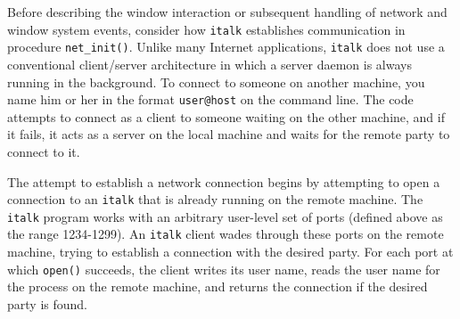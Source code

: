 
Before describing the window interaction or subsequent handling of
network and window system events, consider how \texttt{italk}
establishes communication in procedure \texttt{net\_init()}. Unlike
many Internet applications, \texttt{italk} does not use a conventional
client/server architecture in which a server daemon is always running
in the background. To connect to someone on another machine, you name
him or her in the format \texttt{user@host} on the command line. The
code attempts to connect as a client to someone waiting on the other
machine, and if it fails, it acts as a server on the local machine and
waits for the remote party to connect to it.


The attempt to establish a network connection begins by attempting to
open a connection to an \texttt{italk} that is already running on the
remote machine. The \texttt{italk} program works with an arbitrary
user-level set of ports (defined above as the range 1234-1299). An
\texttt{italk} client wades through these ports on the remote machine,
trying to establish a connection with the desired party. For each port
at which \texttt{open()} succeeds, the client writes its user name,
reads the user name for the process on the remote machine, and returns
the connection if the desired party is found.

